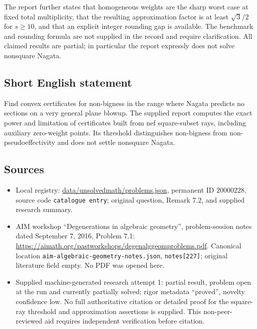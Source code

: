 \documentclass[11pt]{article}
\begin{document}
The report further states that homogeneous weights are the sharp worst case at fixed total multiplicity, that the resulting approximation factor is at least $\sqrt3/2$ for $s\geq10$, and that an explicit integer rounding gap is available. The benchmark and rounding formula are not supplied in the record and require clarification. All claimed results are partial; in particular the report expressly does not solve nonsquare Nagata.
\subsection{Short English statement}
Find convex certificates for non-bigness in the range where Nagata predicts no sections on a very general plane blowup. The supplied report computes the exact power and limitation of certificates built from nef square-subset rays, including auxiliary zero-weight points. Its threshold distinguishes non-bigness from non-pseudoeffectivity and does not settle nonsquare Nagata.
\subsection{Sources}
\begin{itemize}
\item Local registry: \url{data/unsolvedmath/problems.json}, permanent ID $20000228$, source code \texttt{catalogue entry}; original question, Remark 7.2, and supplied research summary.
\item AIM workshop ``Degenerations in algebraic geometry'', problem-session notes dated September 7, 2016, Problem 7.1: \url{https://aimath.org/pastworkshops/degenalggeomproblems.pdf}. Canonical location \texttt{aim-algebraic-geometry-notes.json}, \texttt{notes[227]}; original literature field empty. No PDF was opened here.
\item Supplied machine-generated research attempt 1: partial result, problem open at the run and currently partially solved; rigor metadata ``proved'', novelty confidence low. No full authoritative citation or detailed proof for the square-ray threshold and approximation assertions is supplied. This non-peer-reviewed aid requires independent verification before citation.
\end{itemize}
\end{document}
